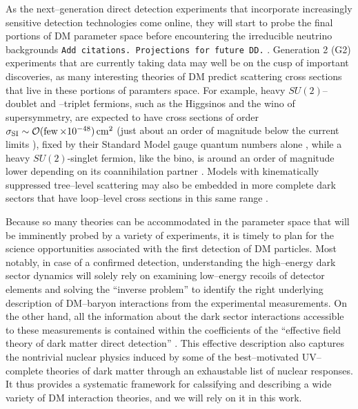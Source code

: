 \documentclass[11pt]{article}
\newcommand{\tenx}[1]{\times 10^{#1}}
\newcommand{\sjwColor}{red}
\newcommand{\sjwtt}[1]{{\color{\sjwColor}\tt #1}}
\begin{document}
As the next--generation direct detection experiments that incorporate increasingly sensitive detection technologies come online, they will start to probe the final portions of DM parameter space before encountering the irreducible neutrino backgrounds \sjwtt{Add citations. Projections for future DD.} \cite{Cushman:2013zza,Billard:2013qya,Ruppin:2014bra,Davis:2014ama,Dent:2016iht}. Generation 2 (G2) experiments that are currently taking data \cite{} may well be on the cusp of important discoveries, as many interesting theories of DM predict scattering cross sections that live in these portions of paramters space. For example, heavy $SU(2)$--doublet and --triplet fermions, such as the Higgsinos and the wino of supersymmetry, are expected to have cross sections of order $\sigma_{\rm SI} \sim \cO(\few\tenx{-48})\cm^2$ (just about an order of magnitude below the current limits \cite{}), fixed by their Standard Model gauge quantum numbers alone \cite{Hill:2011be,Hill:2013hoa,Hill:2014yxa}, while a heavy $SU(2)$-singlet fermion, like the bino, is around an order of magnitude lower depending on its coannihilation partner \cite{Berlin:2015njh}. Models with kinematically suppressed tree--level scattering may also be embedded in more complete dark sectors that have loop--level cross sections in this same range \cite{Ipek:2014gua,McDermott:2014rqa,Appelquist:2015yfa,Appelquist:2015zfa}.

Because so many theories can be accommodated in the parameter space that will be imminently probed by a variety of experiments, it is timely to plan for the science opportunities associated with the first detection of DM particles. Most notably, in case of a confirmed detection, understanding the high--energy dark sector dynamics will solely rely on examining low--energy recoils of detector elements and solving the ``inverse problem'' to identify the right underlying description of DM--baryon interactions from the experimental measurements. On the other hand, all the information about the dark sector interactions accessible to these measurements is contained within the coefficients of the ``effective field theory of dark matter direct detection'' \cite{Fitzpatrick:2012ix, Anand:2013yka}. This effective description also captures the nontrivial nuclear physics induced by some of the best--motivated UV--complete theories of dark matter \cite{Gresham:2014vja, Gluscevic:2015sqa} through an exhaustable list of nuclear responses. It thus provides a systematic framework for calssifying and describing a wide variety of DM interaction theories, and we will rely on it in this work. 
 
\end{document}
